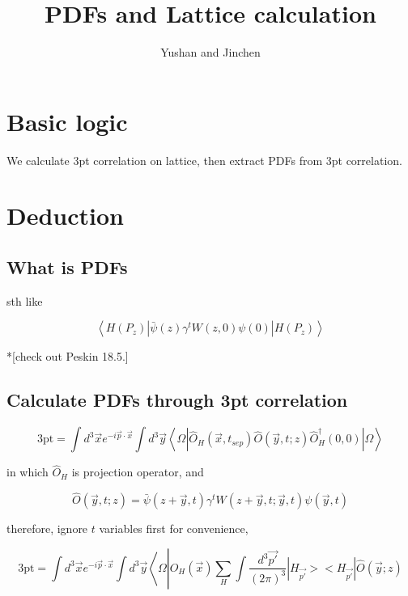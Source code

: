 \documentclass[11pt]{article} %
\title{PDFs and Lattice calculation}
\author{Yushan and Jinchen}
\begin{document}
\maketitle

\section{Basic logic}

\noindent 

We calculate 3pt correlation on lattice, then extract PDFs from 3pt correlation.


\section{Deduction}

\subsection{What is PDFs}

\noindent

sth like 

\[ \left\langle H\left(P_{z}\right)\left|\bar{\psi}(z) \gamma^{t} W(z, 0) \psi(0)\right| H\left(P_{z}\right)\right\rangle \]

*[check out Peskin 18.5.]

\subsection{Calculate PDFs through 3pt correlation}

\noindent

\[ \text{3pt} = \int d^{3} \vec{x} e^{-i \vec{p} \cdot \vec{x}} \int d^3 \vec{y}\left\langle\Omega\left|\hat{O}_{H}\left(\vec{x}, t_{s e p}\right) \hat{O}(\vec{y}, t ; z) \hat{O}_{H}^{\dagger}(0,0)\right| \Omega\right\rangle \]

in which $\hat{O}_{H}$ is projection operator, and 

\[ \hat{O}(\vec{y}, t ; z)=\bar{\psi}(z+\vec{y}, t) \gamma^{t} W(z+\vec{y}, t ; \vec{y}, t) \psi(\vec{y}, t) \]

therefore, {\color{red}ignore $t$ variables first for convenience,}

\[ \text{3pt} = \int d^{3} \vec{x} e^{-i \vec{p} \cdot \vec{x}} \int d^3 \vec{y}\left\langle\Omega\left|\hat{O}_{H}\left(\vec{x}\right) \sum_{H} \int \frac{d^3 \vec{p'}}{(2\pi)^3}  |H_{\vec{p'}}><H_{\vec{p'}}| \hat{O}(\vec{y}; z) \right. \right. \]
    
\end{document}
